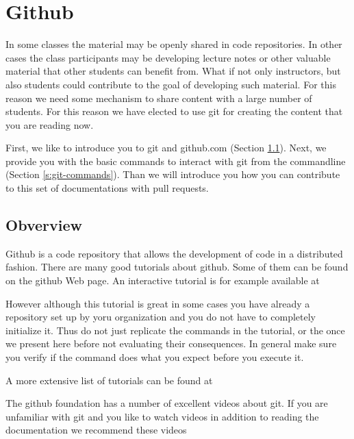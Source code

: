 

\chapter{Github}
\label{C:github}

\FILENAME

In some classes the material may be openly shared in code
repositories. In other cases the class participants may be developing
lecture notes or other valuable material that other students can
benefit from. What if not only instructors, but also students could
contribute to the goal of developing such material. For this reason
we need some mechanism to share content with a large number of
students. For this reason we have elected to use git for creating the
content that you are reading now. 

First, we like to introduce you to git and github.com (Section
\ref{s:github}).  Next, we provide you with the basic commands to
interact with git from the commandline (Section
\ref{s:git-commands}). Than we will introduce you how you can contribute
to this set of documentations with pull requests.

\section{Obverview}\label{s:github}

Github is a code repository that allows the development of code in a
distributed fashion. There are many good tutorials about github.
Some of them can be found on the github Web page. An interactive
tutorial is for example available at


However although this tutorial is great in some cases you have already
a repository set up by yoru organization and you do not have to
completely initialize it. Thus do not just replicate the commands in
the tutorial, or the once we present here before not evaluating their
consequences. In general make sure you verify if the command does what
you expect before you execute it.

A more extensive list of tutorials can be found at


The github foundation has a number of excellent videos about git. If you
are unfamiliar with git and you like to watch videos in addition to
reading the documentation we recommend these videos

